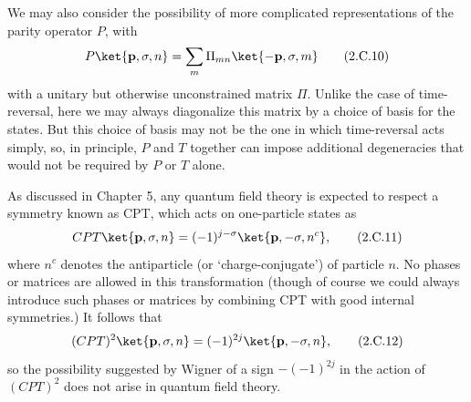 We may also consider the possibility of more complicated representations of
the parity operator $P$, with
\begin{equation}
  P\ket{\mathbf{p},\sigma,n}
    =\sum_m\Pi_{mn}\ket{-\mathbf{p},\sigma,m}
  \tag{2.C.10}\label{eq:2.C.10}
\end{equation}
with a unitary but otherwise unconstrained matrix $\Pi$. Unlike the
case of time-reversal, here we may always diagonalize this matrix by a choice
of basis for the states. But this choice of basis may not be the one in which
time-reversal acts simply, so, in principle, $P$ and $T$ together can impose
additional degeneracies that would not be required by $P$ or $T$ alone.

As discussed in Chapter 5, any quantum field theory is expected to respect a
symmetry known as CPT, which acts on one-particle states as
\begin{equation}
  CPT\ket{\mathbf{p},\sigma,n}
    =(-1)^{j-\sigma}\ket{\mathbf{p},-\sigma,n^c},
  \tag{2.C.11}\label{eq:2.C.11}
\end{equation}
where $n^c$ denotes the antiparticle (or `charge-conjugate') of particle $n$.
No phases or matrices are allowed in this transformation (though of course we
could always introduce such phases or matrices by combining CPT with good
internal symmetries.) It follows that
\begin{equation}
  (CPT)^2\ket{\mathbf{p},\sigma,n}
    =(-1)^{2j}\ket{\mathbf{p},-\sigma,n},
  \tag{2.C.12}\label{eq:2.C.12}
\end{equation}
so the possibility suggested by Wigner of a sign $-(-1)^{2j}$ in the action
of $(CPT)^2$ does not arise in quantum field theory.

